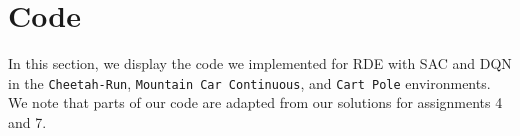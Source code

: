\documentclass[base]{subfiles}
\begin{document}
\section{Code} \label{lilyandkaya:code}

In this section, we display the code we implemented for RDE with SAC and DQN in the \texttt{Cheetah-Run}, \texttt{Mountain Car Continuous}, and \texttt{Cart Pole} environments. We note that parts of our code are adapted from our solutions for assignments 4 and 7.






\end{document}
